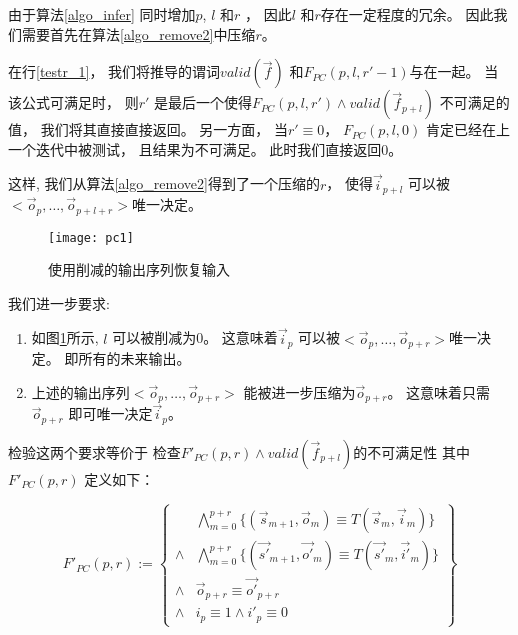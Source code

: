 由于算法\ref{algo_infer} 同时增加$p$, $l$ 和$r$ ，
因此$l$ 和$r$存在一定程度的冗余。
因此我们需要首先在算法\ref{algo_remove2}中压缩$r$。


在行\ref{testr_1}，
我们将推导的谓词$valid(\vec{f})$ 和$F_{PC}(p,l,r'-1)$与在一起。
当该公式可满足时，
则$r'$ 是最后一个使得$F_{PC}(p,l,r')\wedge valid(\vec{f}_{p+l})$ 不可满足的值，
我们将其直接直接返回。
另一方面，
当$r'\equiv 0$，
$F_{PC}(p,l,0)$ 肯定已经在上一个迭代中被测试，
且结果为不可满足。
此时我们直接返回$0$。


这样,
我们从算法\ref{algo_remove2}得到了一个压缩的$r$，
使得$\vec{i}_{p+l}$ 可以被$<\vec{o}_{p},\dots,\vec{o}_{p+l+r}>$唯一决定。

\begin{figure}[t]
\begin{center}
\texttt{[image: pc1]}
\end{center}
\caption{使用削减的输出序列恢复输入}
  \label{fig_pc1}
\end{figure}

我们进一步要求:
\begin{enumerate}
 \item 如图\ref{fig_pc1}所示,
 $l$ 可以被削减为0。
 这意味着$\vec{i}_{p}$ 可以被$<\vec{o}_{p},\dots,\vec{o}_{p+r}>$唯一决定。
 即所有的未来输出。
 \item 上述的输出序列$<\vec{o}_{p},\dots,\vec{o}_{p+r}>$
 能被进一步压缩为$\vec{o}_{p+r}$。
 这意味着只需$\vec{o}_{p+r}$ 即可唯一决定$\vec{i}_p$。
\end{enumerate}

检验这两个要求等价于
检查$F'_{PC}(p,r)\wedge valid(\vec{f}_{p+l})$的不可满足性
其中$F'_{PC}(p,r)$ 定义如下：

\begin{equation}\label{uniqt11}
F'_{PC}(p,r):=
\left\{
\begin{array}{cc}
&\bigwedge_{m=0}^{p+r}
\{
(\vec{s}_{m+1},\vec{o}_m)\equiv T(\vec{s}_m,\vec{i}_m)
\}
\\
\wedge&\bigwedge_{m=0}^{p+r}
\{
(\vec{s'}_{m+1},\vec{o'}_m)\equiv T(\vec{s'}_m,\vec{i'}_m)
\}
\\
\wedge&\vec{o}_{p+r}\equiv \vec{o'}_{p+r} \\
\wedge& i_{p}\equiv 1 \wedge  i'_{p}\equiv 0
\end{array}
\right\}
\end{equation}


